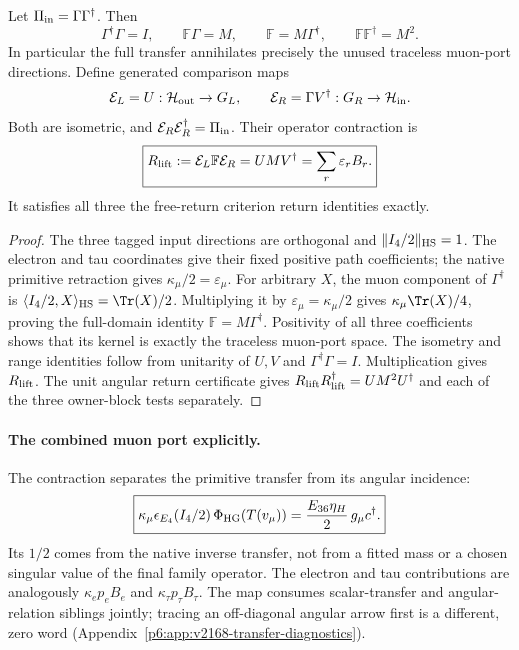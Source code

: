 \documentclass[12pt,a4paper]{article}
\begin{document}
\begin{theorem}
\label{p6:thm:v2168-complete-transfer-lift}
Let $\Pi_{\rm in}=\Gamma\Gamma^\dagger$. Then
\[
 \boxed{\Gamma^\dagger\Gamma=I,\qquad
 \mathbb F\Gamma=M,\qquad
 \mathbb F=M\Gamma^\dagger,\qquad
 \mathbb F\mathbb F^\dagger=M^2.}
\]
In particular the full transfer annihilates precisely the unused traceless
muon-port directions. Define generated comparison maps
\[
 \mathcal E_L=U:\mathcal H_{\rm out}\to G_L,\qquad
 \mathcal E_R=\Gamma V^\dagger:G_R\to\mathcal H_{\rm in}.
\]
Both are isometric, and $\mathcal E_R\mathcal E_R^\dagger=\Pi_{\rm in}$.
Their operator contraction is
\[
 \boxed{R_{\rm lift}:=\mathcal E_L\mathbb F\mathcal E_R
       =UMV^\dagger=\sum_r\varepsilon_rB_r.}
\]
It satisfies all three the free-return criterion return identities exactly.
\end{theorem}
\begin{proof}
The three tagged input directions are orthogonal and $\|I_4/2\|_{\rm HS}=1$.
The electron and tau coordinates give their fixed positive path coefficients;
the native primitive retraction gives $\kappa_\mu/2=\varepsilon_\mu$.
For arbitrary $X$, the muon component of $\Gamma^\dagger$ is
$\langle I_4/2,X\rangle_{\rm HS}=\Tr(X)/2$.
Multiplying it by $\varepsilon_\mu=\kappa_\mu/2$ gives
$\kappa_\mu\Tr(X)/4$, proving the full-domain identity
$\mathbb F=M\Gamma^\dagger$. Positivity of all three coefficients shows
that its kernel is exactly the traceless muon-port space.
The isometry and range identities follow from unitarity of $U,V$ and
$\Gamma^\dagger\Gamma=I$. Multiplication gives $R_{\rm lift}$.
The unit angular return certificate gives
$R_{\rm lift}R_{\rm lift}^\dagger=UM^2U^\dagger$ and each of the three
owner-block tests separately.
\end{proof}

\paragraph{The combined muon port explicitly.}
The contraction separates the primitive transfer from its angular incidence:
\[
 \boxed{\kappa_\mu\epsilon_{E_4}(I_4/2)\,
       \Phi_{\rm HG}(T(v_\mu))
       =\frac{E_{36}\eta_H}{2}\,g_\mu c^\dagger.}
\]
Its $1/2$ comes from the native inverse transfer, not from a fitted mass or
a chosen singular value of the final family operator.
The electron and tau contributions are analogously
$\kappa_ep_e B_e$ and $\kappa_\tau p_\tau B_\tau$.
The map consumes scalar-transfer and angular-relation siblings jointly;
tracing an off-diagonal angular arrow first is a different, zero word
(Appendix~\ref{p6:app:v2168-transfer-diagnostics}).
\end{document}
